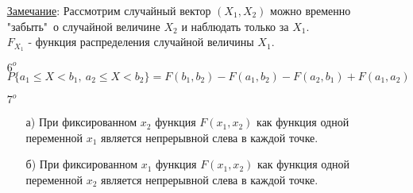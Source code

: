 \begin{enumerate}
\underline{Замечание}: Рассмотрим случайный вектор $(X_1, X_2)$ можно временно "забыть"\ о случайной величине $X_2$ и наблюдать только за $X_1$. \\
$F_{X_1}$ - функция распределения случайной величины $X_1$.

\item[$6^o$] $P\{a_1 \leqslant X < b_1, \ a_2 \leqslant X < b_2\} = F(b_1, b_2) - F(a_1, b_2) - F(a_2, b_1) + F(a_1, a_2)$

\item[$7^o$] 
	\begin{enumerate}
	\item[а)] При фиксированном $x_2$ функция $F(x_1, x_2)$ как функция одной переменной $x_1$ является непрерывной слева в каждой точке.
	
	\item[б)] При фиксированном $x_1$ функция $F(x_1, x_2)$ как функция одной переменной $x_2$ является непрерывной слева в каждой точке.
	\end{enumerate}
\end{enumerate}


